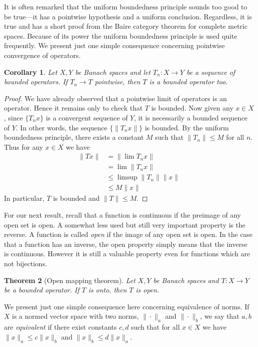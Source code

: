 \documentclass[11pt,oneside]{amsbook}
\theoremstyle{definition}
\theoremstyle{plain}
\newtheorem{thm}{Theorem}[section]
\newtheorem{cor}[thm]{Corollary}
\theoremstyle{definition}
\theoremstyle{remark}
\numberwithin{equation}{section}
\numberwithin{figure}{section}
\begin{document}
It is often remarked that the uniform boundedness principle sounds too good to be true---it has a pointwise hypothesis and a uniform conclusion. Regardless, it is true and has a short proof from the Baire category theorem for complete metric spaces. Because of its power the uniform boundedness principle is used quite frequently. We present just one simple consequence concerning pointwise convergence of operators.

\begin{cor}
  Let $X,Y$ be Banach spaces and let $T_n\colon X\to Y$ be a sequence of bounded operators. If $T_n\to T$ pointwise, then $T$ is a bounded operator too.
\end{cor}

\begin{proof}
  We have already observed that a pointwise limit of operators is an operator. Hence it remains only to check that $T$ is bounded. Now given any $x\in X$, since $\{T_nx\}$ is a convergent sequence of $Y$, it is necessarily a bounded sequence of $Y$. In other words, the sequence $\{\|T_nx\|\}$ is bounded. By the uniform boundedness principle, there exists a constant $M$ such that $\|T_n\|\leq M$ for all $n$. Thus for any $x\in X$ we have
  \begin{align*}
    \|Tx\|&=\|\lim T_nx\|\\
          &=\lim\|T_nx\|\\
          &\leq\limsup\|T_n\|\|x\|\\
          &\leq M\|x\|
  \end{align*}
  In particular, $T$ is bounded and $\|T\|\leq M$.
\end{proof}

For our next result, recall that a function is continuous if the preimage of any open set is open. A somewhat less used but still very important property is the reverse. A function is called \emph{open} if the image of any open set is open. In the case that a function has an inverse, the open property simply means that the inverse is continuous. However it is still a valuable property even for functions which are not bijections.

\begin{thm}[Open mapping theorem]
  Let $X,Y$ be Banach spaces and $T\colon X\to Y$ be a bounded operator. If $T$ is onto, then $T$ is open.
\end{thm}

We present just one simple consequence here concerning equivalence of norms. If $X$ is a normed vector space with two norms, $\|\cdot\|_a$ and $\|\cdot\|_b$, we say that $a,b$ are \emph{equivalent} if there exist constants $c,d$ such that for all $x\in X$ we have $\|x\|_a\leq c\|x\|_b$ and $\|x\|_b\leq d\|x\|_a$.
\end{document}
